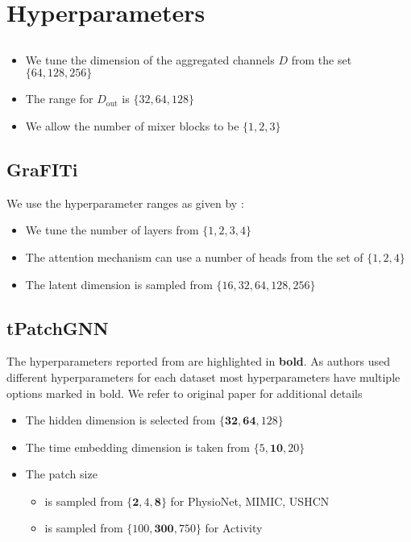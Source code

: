\section{Hyperparameters}
\subsection{\model{}}\label{app:model}
\begin{itemize}
    \item We tune the dimension of the aggregated channels $D$ from the set $\{64,128,256 \}$
    \item The range for $D_\text{out}$ is $\{32,64,128\}$
    \item We allow the number of mixer blocks to be   $\{1,2,3\}$
\end{itemize}

\subsection{GraFITi}\label{app:graf}
We use the hyperparameter ranges as given by \citeauthor{Yalavarthi2023.Forecasting}:
\begin{itemize}
    \item We tune the number of layers from $\{1,2,3,4\}$
    \item The attention mechanism can use a number of heads from the set of $\{1,2,4\}$
    \item The latent dimension is sampled from $\{16,32,64,128,256\}$
\end{itemize}

\subsection{tPatchGNN}\label{app:tpatch}
The hyperparameters reported from \citeauthor{Zhang.Irregular} are highlighted in \textbf{bold}.
As authors used different hyperparameters for each dataset most hyperparameters have multiple options marked in bold. 
We refer to original paper for additional details~\cite{Zhang.Irregular}
\begin{itemize}
    \item The hidden dimension is selected from $\{\textbf{32},\textbf{64},128\}$
    \item The time embedding dimension is taken from  $\{5,\textbf{10},20\}$
    \item The patch size
    \begin{itemize}
        \item is sampled from $\{\textbf{2},4,\textbf{8}\}$ for PhysioNet, MIMIC, USHCN
        \item is sampled from $\{100,\textbf{300},750\}$ for Activity
    \end{itemize} 
\end{itemize}
